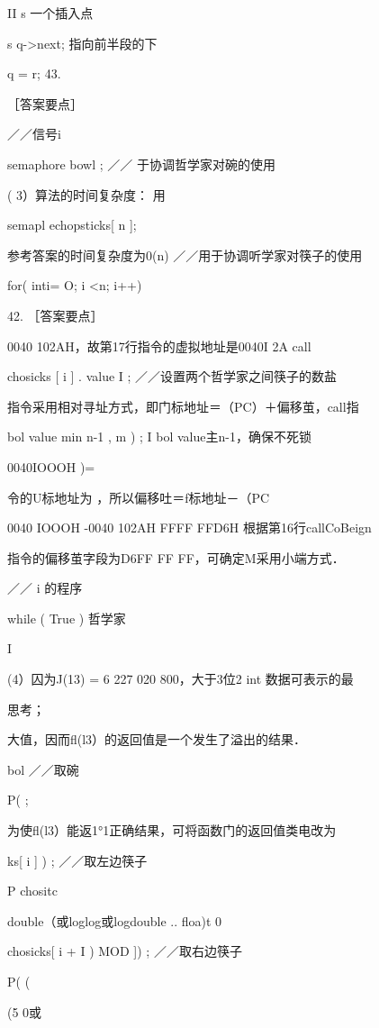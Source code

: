 {{{    II s    一个插入点

    s   q->next;     指向前半段的下

    q = r;    43.

    ［答案要点］

    ／／信号i

    semaphore bowl ;    ／／   于协调哲学家对碗的使用

   ( 3）算法的时间复杂度：    用

    semapl  echopsticks[ n ];

   参考答案的时间复杂度为0(n)    ／／用于协调听学家对筷子的使用

    for( inti= O; i <n; i++)

42. ［答案要点］

    0040 102AH，故第17行指令的虚拟地址是0040I 2A   call

    chosicks [ i  ] . value   I ;   ／／设置两个哲学家之间筷子的数盐

    指令采用相对寻址方式，即门标地址＝（PC）＋偏移茧，call指

   bol value   min  n-1 ,  m ) ;    I  bol value主n-1，确保不死锁

    0040IOOOH    )=

    令的U标地址为    ，所以偏移吐＝f标地址－（PC

    0040 IOOOH -0040 102AH   FFFF FFD6H   根据第16行callCoBeign

    指令的偏移茧字段为D6FF FF FF，可确定M采用小端方式．

    ／／    i 的程序

  while ( True )    哲学家

    I

    (4）囚为J(13) = 6 227 020 800，大于3位2  int 数据可表示的最

    思考；

    大值，因而fl(l3）的返回值是一个发生了溢出的结果．

    bol    ／／取碗

    P(     ;

    为使fl(l3）能返1°1正确结果，可将函数门的返回值类电改为

    ks[ i ] ) ;     ／／取左边筷子

    P chositc

    double（或loglog或logdouble .. floa)t 0

    chosicks[  i  + I ) MOD  ]) ;    ／／取右边筷子

    P(     (

    (5    0或

}}}
